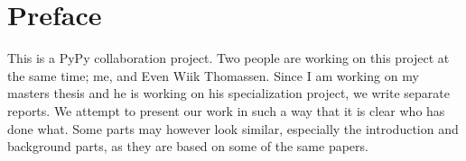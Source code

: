
\section*{Preface}

This is a PyPy collaboration project. Two people are working on this
project at the same time; me, and Even Wiik Thomassen. Since I am working
on my masters thesis and he is working on his specialization project, we 
write separate reports. We attempt to present our work in such a way that
it is clear who has done what. Some parts may however look similar,
especially the introduction and background parts, as they are based on 
some of the same papers.

